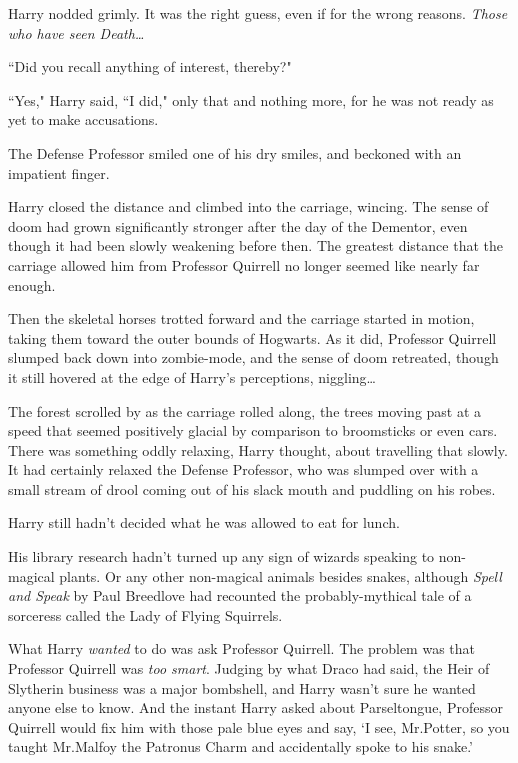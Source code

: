 Harry nodded grimly. It was the right guess, even if for the wrong reasons. \emph{Those who have seen Death{\ldots}}

``Did you recall anything of interest, thereby?"

``Yes," Harry said, ``I did," only that and nothing more, for he was not ready as yet to make accusations.

The Defense Professor smiled one of his dry smiles, and beckoned with an impatient finger.

Harry closed the distance and climbed into the carriage, wincing. The sense of doom had grown significantly stronger after the day of the Dementor, even though it had been slowly weakening before then. The greatest distance that the carriage allowed him from Professor Quirrell no longer seemed like nearly far enough.

Then the skeletal horses trotted forward and the carriage started in motion, taking them toward the outer bounds of Hogwarts. As it did, Professor Quirrell slumped back down into zombie-mode, and the sense of doom retreated, though it still hovered at the edge of Harry's perceptions, niggling{\ldots}

The forest scrolled by as the carriage rolled along, the trees moving past at a speed that seemed positively glacial by comparison to broomsticks or even cars. There was something oddly relaxing, Harry thought, about travelling that slowly. It had certainly relaxed the Defense Professor, who was slumped over with a small stream of drool coming out of his slack mouth and puddling on his robes.

Harry still hadn't decided what he was allowed to eat for lunch.

His library research hadn't turned up any sign of wizards speaking to non-magical plants. Or any other non-magical animals besides snakes, although \emph{Spell and Speak} by Paul Breedlove had recounted the probably-mythical tale of a sorceress called the Lady of Flying Squirrels.

What Harry \emph{wanted} to do was ask Professor Quirrell. The problem was that Professor Quirrell was \emph{too smart}. Judging by what Draco had said, the Heir of Slytherin business was a major bombshell, and Harry wasn't sure he wanted anyone else to know. And the instant Harry asked about Parseltongue, Professor Quirrell would fix him with those pale blue eyes and say, `I see, Mr.\?Potter, so you taught Mr.\?Malfoy the Patronus Charm and accidentally spoke to his snake.'

